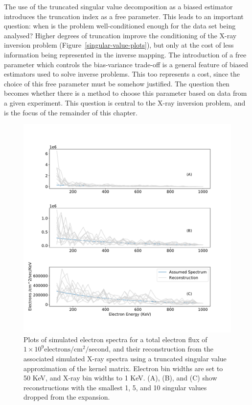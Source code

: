 The use of the truncated singular value decomposition as a biased estimator introduces the truncation index as a free parameter. This leads to an important question: when is the problem well-conditioned enough for the data set being analysed? Higher degrees of truncation improve the conditioning of the X-ray inversion problem (Figure~\ref{singular-value-plots}), but only at the cost of less information being represented in the inverse mapping. The introduction of a free parameter which controls the bias-variance trade-off is a general feature of biased estimators used to solve inverse problems. This too represents a cost, since the choice of this free parameter must be somehow justified. The question then becomes whether there is a method to choose this parameter based on data from a given experiment. This question is central to the X-ray inversion problem, and is the focus of the remainder of this chapter. 

\begin{figure}[p]
    \centering
    \includegraphics[width=.95\textwidth]{figures/fig_7.pdf}
    \caption{Plots of simulated electron spectra for a total electron flux of $1\times10^9 \mbox{electrons} / \mbox{cm}^2 / \mbox{second}$, and their reconstruction from the associated simulated X-ray spectra using a truncated singular value approximation of the kernel matrix. Electron bin widths are set to 50 KeV, and X-ray bin widths to 1 KeV. (A), (B), and (C) show reconstructions with the smallest 1, 5, and 10 singular values dropped from the expansion.}
    \label{tsvd_test}
\end{figure}

